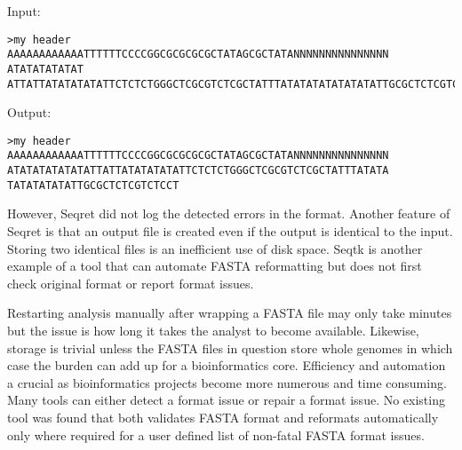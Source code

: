 Input:

\begin{verbatim}
>my header
AAAAAAAAAAAATTTTTTCCCCGGCGCGCGCGCTATAGCGCTATANNNNNNNNNNNNNNN
ATATATATATAT
ATTATTATATATATATTCTCTCTGGGCTCGCGTCTCGCTATTTATATATATATATATATTGCGCTCTCGTCTCCT\end{verbatim}

Output:

\begin{verbatim}
>my header
AAAAAAAAAAAATTTTTTCCCCGGCGCGCGCGCTATAGCGCTATANNNNNNNNNNNNNNN
ATATATATATATATTATTATATATATATTCTCTCTGGGCTCGCGTCTCGCTATTTATATA
TATATATATATTGCGCTCTCGTCTCCT
\end{verbatim}

However, Seqret did not log the detected errors in the format. Another feature of Seqret is that an output file is created even if the output is identical to the input. Storing two identical files is an inefficient use of disk space. Seqtk \cite{Li2013} is another example of a tool that can automate FASTA reformatting but does not first check original format or report format issues. 

Restarting analysis manually after wrapping a FASTA file may only take minutes but the issue is how long it takes the analyst to become available. Likewise, storage is trivial unless the FASTA files in question store whole genomes in which case the burden can add up for a bioinformatics core. Efficiency and automation a crucial as bioinformatics projects become more numerous and time consuming. Many tools can either detect a format issue or repair a format issue. No existing tool was found that both validates FASTA format and reformats automatically only where required for a user defined list of non-fatal FASTA format issues.

  
  
  
  
  
  
  
  
  
  
  
  
  
  
  
  
  
  
  
  
  
  
  
  
  
  
  
  
  
  